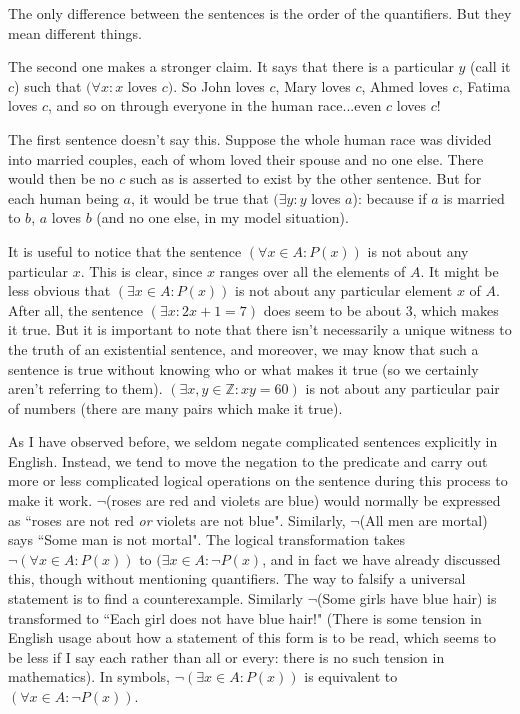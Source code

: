 \documentclass[12pt]{article}
\begin{document}
The only difference between the sentences is the order of the quantifiers.  But they mean different things.

The second one makes a stronger claim.  It says that there is a particular $y$ (call it $c$) such that $(\forall x:x$ loves $c)$.  So John loves $c$, Mary loves $c$, Ahmed loves $c$, Fatima loves $c$, and so on through everyone in the human race...even $c$ loves $c$!

The first sentence doesn't say this.  Suppose the whole human race was divided into married couples, each of whom loved their spouse and no one else.  There would then be no $c$ such as is asserted to exist by the other sentence.  But for each human being $a$, it would be true that $(\exists y:y$ loves $a$):  because if $a$ is married to $b$, $a$ loves $b$ (and no one else, in my model situation).

It is useful to notice that the sentence $(\forall x\in A:P(x))$ is not about any particular $x$.  This is clear, since $x$ ranges over all the elements of $A$.
It might be less obvious that $(\exists x\in A:P(x))$ is not about any particular element $x$ of $A$.  After all, the sentence $(\exists x:2x+1=7)$ does seem to be about 3, which makes it true.  But it is important to note that there isn't necessarily a unique witness to the truth of an existential sentence, and moreover, we may know that such a sentence is true without knowing who or what makes it true (so we certainly aren't referring to them).
$(\exists x,y\in {\mathbb Z}:xy=60)$ is  not about any particular pair of numbers (there are many pairs which make it true).

As I have observed before, we seldom negate complicated sentences explicitly in English.  Instead, we tend to move the negation to the predicate and carry out more or less complicated logical operations on the sentence during this process to make it work.  $\neg$(roses are red and violets are blue) would normally be expressed as ``roses are not red {\em or\/} violets are not blue".  Similarly, $\neg$(All men are mortal) says
``Some man is not mortal".  The logical transformation takes $\neg(\forall x\in A:P(x))$ to $(\exists x \in A:\neg P(x)$, and in fact we have already discussed this, though without mentioning quantifiers.  The way to falsify a universal statement is to find a counterexample.   Similarly
$\neg$(Some girls have blue hair) is transformed to ``Each girl does not have blue hair!" (There is some tension in English usage about how a statement of this form is to be read, which seems to be less if I say each rather than all or every:  there is no such tension in mathematics).  In symbols, $\neg(\exists x \in A:P(x))$ is equivalent to $(\forall x \in A:\neg P(x))$.
\end{document}
